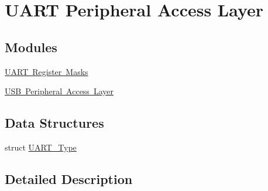 \hypertarget{group___u_a_r_t___peripheral___access___layer}{}\section{U\+A\+RT Peripheral Access Layer}
\label{group___u_a_r_t___peripheral___access___layer}
\subsection*{Modules}
\begin{DoxyCompactItemize}
\item 
\mbox{\hyperlink{group___u_a_r_t___register___masks}{U\+A\+R\+T Register Masks}}
\item 
\mbox{\hyperlink{group___u_s_b___peripheral___access___layer}{U\+S\+B Peripheral Access Layer}}
\end{DoxyCompactItemize}
\subsection*{Data Structures}
\begin{DoxyCompactItemize}
\item 
struct \mbox{\hyperlink{struct_u_a_r_t___type}{U\+A\+R\+T\+\_\+\+Type}}
\end{DoxyCompactItemize}


\subsection{Detailed Description}
